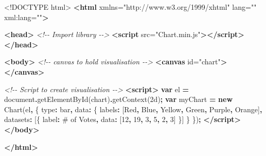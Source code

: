 \documentclass[
]{krantz}
\makeatletter
\newenvironment{Shaded}{\begin{snugshade}}{\end{snugshade}}
\newcommand{\BuiltInTok}[1]{#1}
\newcommand{\CommentTok}[1]{\textcolor[rgb]{0.37,0.37,0.37}{\textit{#1}}}
\newcommand{\DataTypeTok}[1]{\textcolor[rgb]{0.27,0.27,0.27}{#1}}
\newcommand{\DecValTok}[1]{\textcolor[rgb]{0.06,0.06,0.06}{#1}}
\newcommand{\FunctionTok}[1]{\textcolor[rgb]{0,0,0}{#1}}
\newcommand{\KeywordTok}[1]{\textcolor[rgb]{0.27,0.27,0.27}{\textbf{#1}}}
\newcommand{\NormalTok}[1]{#1}
\newcommand{\OperatorTok}[1]{\textcolor[rgb]{0.43,0.43,0.43}{\textbf{#1}}}
\newcommand{\OtherTok}[1]{\textcolor[rgb]{0.37,0.37,0.37}{#1}}
\newcommand{\StringTok}[1]{\textcolor[rgb]{0.5,0.5,0.5}{#1}}
\newenvironment{kframe}{%
\medskip{}
\setlength{\fboxsep}{.8em}
 \def\at@end@of@kframe{}%
 \ifinner\ifhmode%
  \def\at@end@of@kframe{\end{minipage}}%
  \begin{minipage}{\columnwidth}%
 \fi\fi%
 \def\FrameCommand##1{\hskip\@totalleftmargin \hskip-\fboxsep
 \colorbox{shadecolor}{##1}\hskip-\fboxsep
     \hskip-\linewidth \hskip-\@totalleftmargin \hskip\columnwidth}%
 \MakeFramed {\advance\hsize-\width
   \@totalleftmargin\z@ \linewidth\hsize
   \@setminipage}}%
 {\par\unskip\endMakeFramed%
 \at@end@of@kframe}
\renewenvironment{Shaded}{\begin{kframe}}{\end{kframe}}
\makeatother
\begin{document}
\begin{Shaded}
\begin{Highlighting}[]
\DataTypeTok{\textless{}!DOCTYPE }\NormalTok{html}\DataTypeTok{\textgreater{}}
\KeywordTok{\textless{}html}\OtherTok{ xmlns=}\StringTok{"http://www.w3.org/1999/xhtml"}\OtherTok{ lang=}\StringTok{""}\OtherTok{ xml:lang=}\StringTok{""}\KeywordTok{\textgreater{}}

\KeywordTok{\textless{}head\textgreater{}}
  \CommentTok{\textless{}!{-}{-} Import library {-}{-}\textgreater{}}
  \KeywordTok{\textless{}script}\OtherTok{ src=}\StringTok{"Chart.min.js"}\KeywordTok{\textgreater{}\textless{}/script\textgreater{}}
\KeywordTok{\textless{}/head\textgreater{}}

\KeywordTok{\textless{}body\textgreater{}}
  \CommentTok{\textless{}!{-}{-} canvas to hold visualisation {-}{-}\textgreater{}}
  \KeywordTok{\textless{}canvas}\OtherTok{ id=}\StringTok{"chart"}\KeywordTok{\textgreater{}\textless{}/canvas\textgreater{}}

  \CommentTok{\textless{}!{-}{-} Script to create visualisation {-}{-}\textgreater{}}
  \KeywordTok{\textless{}script\textgreater{}}
    \KeywordTok{var}\NormalTok{ el }\OperatorTok{=} \BuiltInTok{document}\OperatorTok{.}\FunctionTok{getElementById}\NormalTok{(}\StringTok{\textquotesingle{}chart\textquotesingle{}}\NormalTok{)}\OperatorTok{.}\FunctionTok{getContext}\NormalTok{(}\StringTok{\textquotesingle{}2d\textquotesingle{}}\NormalTok{)}\OperatorTok{;}    
    \KeywordTok{var}\NormalTok{ myChart }\OperatorTok{=} \KeywordTok{new}\NormalTok{ Chart(el}\OperatorTok{,}\NormalTok{ \{}
      \DataTypeTok{type}\OperatorTok{:} \StringTok{\textquotesingle{}bar\textquotesingle{}}\OperatorTok{,}
      \DataTypeTok{data}\OperatorTok{:}\NormalTok{ \{}
        \DataTypeTok{labels}\OperatorTok{:}\NormalTok{ [}\StringTok{\textquotesingle{}Red\textquotesingle{}}\OperatorTok{,} \StringTok{\textquotesingle{}Blue\textquotesingle{}}\OperatorTok{,} \StringTok{\textquotesingle{}Yellow\textquotesingle{}}\OperatorTok{,} \StringTok{\textquotesingle{}Green\textquotesingle{}}\OperatorTok{,} \StringTok{\textquotesingle{}Purple\textquotesingle{}}\OperatorTok{,} \StringTok{\textquotesingle{}Orange\textquotesingle{}}\NormalTok{]}\OperatorTok{,}
        \DataTypeTok{datasets}\OperatorTok{:}\NormalTok{ [\{}
          \DataTypeTok{label}\OperatorTok{:} \StringTok{\textquotesingle{}\# of Votes\textquotesingle{}}\OperatorTok{,}
          \DataTypeTok{data}\OperatorTok{:}\NormalTok{ [}\DecValTok{12}\OperatorTok{,} \DecValTok{19}\OperatorTok{,} \DecValTok{3}\OperatorTok{,} \DecValTok{5}\OperatorTok{,} \DecValTok{2}\OperatorTok{,} \DecValTok{3}\NormalTok{]}
\NormalTok{        \}]}
\NormalTok{      \}}
\NormalTok{    \})}\OperatorTok{;}
  \KeywordTok{\textless{}/script\textgreater{}}
\KeywordTok{\textless{}/body\textgreater{}}

\KeywordTok{\textless{}/html\textgreater{}}
\end{Highlighting}
\end{Shaded}
\end{document}
